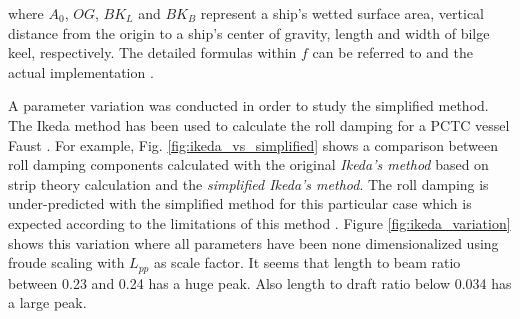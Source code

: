 

where $A_{0}$, $OG$, $BK_{L}$ and $BK_{B}$ represent a ship's wetted surface area, vertical distance from the origin to a ship's center of gravity, length and width of bilge keel, respectively. The detailed formulas within $f$ can be referred to \parencite{kawahara_simple_2011} and the actual implementation \parencite{alexandersson_martinlarsalbertrolldecay-estimators_2020}.



{}


A parameter variation was conducted in order to study the simplified method.
The Ikeda method has been used to calculate the roll damping for a PCTC vessel Faust \parencite{soder_assessment_2019}. For example, Fig. \ref{fig:ikeda_vs_simplified} shows a comparison between roll damping components calculated with the original \emph{Ikeda's method} based on strip theory calculation and the \emph{simplified Ikeda's method}. The roll damping is under-predicted with the simplified method for this particular case which is expected according to the limitations of this method  \parencite{kawahara_simple_2011}.
Figure \ref{fig:ikeda_variation} shows this variation where all parameters have been none dimensionalized using froude scaling with $L_{pp}$ as scale factor. 
It seems that length to beam ratio between 0.23 and 0.24 has a huge peak. Also length to draft ratio below 0.034 has a large peak. 

